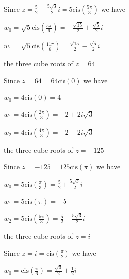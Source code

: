 \documentclass{ximera}
\begin{document}
\begin{question}
\begin{problem}
\begin{solution}

Since $z=\frac{5}{2} - \frac{5\sqrt{3}}{2}i = 5\text{cis}\left(\frac{5\pi}{3}\right)$ we have 

$w_{0} =\sqrt{5}\text{cis}\left(\frac{5\pi}{6}\right) = -\frac{\sqrt{15}}{2} + \frac{\sqrt{5}}{2}i$

$w_{1} = \sqrt{5}\text{cis}\left(\frac{11\pi}{6}\right) = \frac{\sqrt{15}}{2} - \frac{\sqrt{5}}{2}i$

\end{solution}

\end{problem}

\begin{problem}
the three cube roots of $z=64$

\begin{solution}

Since $z = 64 = 64\text{cis}\left(0\right)$ we have 

$w_{0} = 4\text{cis}\left(0\right) = 4$

$w_{1} =4\text{cis}\left(\frac{2\pi}{3}\right) = -2 + 2i\sqrt{3}$

$w_{2} = 4\text{cis}\left(\frac{4\pi}{3}\right) =  -2 - 2i\sqrt{3}$

\end{solution}
\end{problem}

\begin{problem}
the three cube roots of $z = -125$

\begin{solution}
Since $z = -125 = 125\text{cis}\left(\pi\right)$ we have 

$w_{0} = 5\text{cis}\left(\frac{\pi}{3}\right) = \frac{5}{2} + \frac{5\sqrt{3}}{2} i$

$w_{1} =5\text{cis}\left(\pi\right) = -5$

$w_{2} = 5\text{cis}\left(\frac{5\pi}{3}\right) = \frac{5}{2} - \frac{5\sqrt{3}}{2} i$
\end{solution}
\end{problem}

\begin{problem}
the three cube roots of $z = i$

\begin{solution}
Since $z = i = \text{cis}\left(\frac{\pi}{2}\right)$ we have 

$w_{0} = \text{cis}\left(\frac{\pi}{6}\right) = \frac{\sqrt{3}}{2} + \frac{1}{2}i$


\end{solution}
\end{problem}
\end{question}
\end{document}
